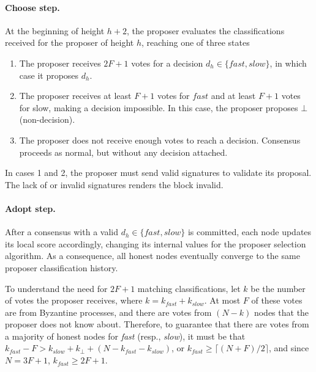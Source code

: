\paragraph{Choose step.}
At the beginning of height $h+2$, the proposer evaluates the classifications received for the proposer of height $h$, reaching one of three states
\begin{enumerate}
\item The proposer receives  $2F+1$ votes for a decision $d_h \in \{fast, slow\}$, in which case it proposes $d_h$.
\item The proposer receives at least $F+1$ votes for $fast$ and at least $F+1$ votes for slow, making a decision impossible. In this case, the proposer proposes $\bot$ (non-decision).
\item The proposer does not receive enough votes to reach a decision. Consensus proceeds as normal, but without any decision attached. 
\end{enumerate}
In cases 1 and 2, the proposer must send valid signatures to validate its proposal. 
The lack of or invalid signatures renders the block invalid. 


\paragraph{Adopt step.}
After a consensus with a valid $d_h \in \{fast, slow\}$ is committed, each node updates its local score accordingly, changing its internal values for the proposer selection algorithm. 
As a consequence, all honest nodes eventually converge to the same proposer classification history.

To understand the need for $2F+1$ matching 
classifications, let $k$ be the number of votes the proposer receives, where
$k = k_{fast} + k_{slow}$. %
At most $F$ of these votes are from Byzantine processes, and there are votes from $(N-k)$ nodes that the proposer does not know about.
Therefore, to guarantee that there are votes from a majority of honest nodes for \textit{fast} (resp., \textit{slow}), it must be that 
$k_{fast} - F > k_{slow} + k_\bot + (N - k_{fast} - k_{slow}
)$, or $k_{fast} \geq \lceil (N+F)/2 \rceil$, and since $N=3F+1$, 
$k_{fast} \geq 2F+1$.

